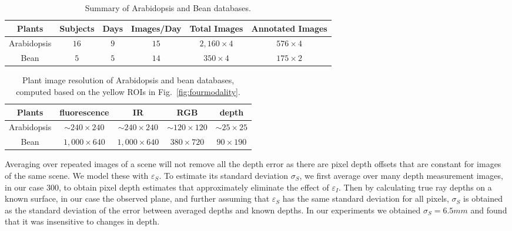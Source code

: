 \begin{table*}[t!]
\begin{center}
\caption{Summary of Arabidopsis and Bean databases.}%
\label{tab:stat}
\begin{tabular}{c|c|c|c|c|c}
\hline
Plants & Subjects & Days & Images/Day & Total Images & Annotated Images \\
\hline
Arabidopsis & $16$ & $9$ & $15$ & $2,160\times 4$ & $576\times 4$ \\
\hline
Bean & $5$ & $5$ & $14$ & $350\times 4$ & $175\times 2$ \\
\hline
\end{tabular}
\end{center}
\end{table*}



\begin{table*}
\begin{center}
\caption{Plant image resolution of Arabidopsis and bean databases, computed based on the yellow ROIs in Fig.~\ref{fig:fourmodality}.}
\label{tab:resolution}
\begin{tabular}{c|c|c|c|c}
\hline
Plants & fluorescence & IR & RGB & depth \\
\hline
Arabidopsis & $\sim$$240\times240$ & $\sim$$240\times240$ & $\sim$$120\times120$ & $\sim$$25\times25$ \\
Bean & $1,000\times640$ & $1,000\times640$ & $380\times720$ & $90\times190$ \\
\hline
\end{tabular}
\end{center}
\end{table*}

Averaging over repeated images of a scene will not remove all the depth error as there are pixel depth offsets that are constant for images of the same scene.
We model these with $\varepsilon_S$.
To estimate its standard deviation $\sigma_S$, we first average over many depth measurement images, in our case $300$, to obtain pixel depth estimates that approximately eliminate the effect of $\varepsilon_I$. Then by calculating true ray depths on a known surface, in our case the observed plane, and further assuming that $\varepsilon_S$ has the same standard deviation for all pixels, $\sigma_S$ is obtained as the standard deviation of the error between averaged depths and known depths. In our experiments we obtained $\sigma_S=6.5mm$ and found that it was insensitive to changes in depth.

